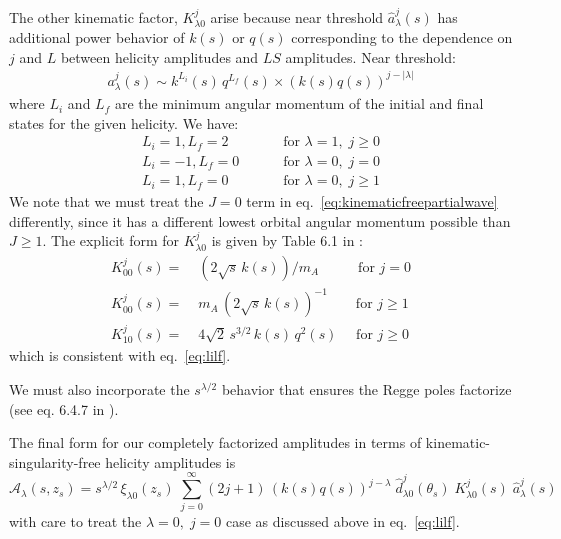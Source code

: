 \documentclass[10pt, aps,prd,amsmath,amssymb,superscriptaddress,onecolumn,
nofootinbib,showpacs,preprintnumbers]{revtex4-1}
\begin{document}
The other kinematic factor, \(K^j_{\lambda0}\) arise  because near threshold \(\hat{a}_\lambda^j(s)\) has additional power behavior of \(k(s)\) or \(q(s)\) corresponding to the dependence on \(j\) and \(L\) between helicity amplitudes and \(LS\) amplitudes. Near threshold:
  \begin{gather}
    a^j_\lambda(s) \sim k^{L_i}(s) \, q^{L_f}(s) \times (k(s)q(s))^{j- |\lambda|}
  \end{gather}
where \(L_i\) and \(L_f\) are the minimum angular momentum of the initial and final states for the given helicity. We have:
  \begin{align}
      L_i = 1 , L_f = 2& \qquad  \text{ for } \lambda = 1, \; j \geq 0 \nonumber \\
      L_i = -1, L_f = 0 &\qquad  \text{ for } \lambda = 0, \; j = 0  \label{eq:lilf} \\
      L_i = 1, L_f = 0 &\qquad  \text{ for } \lambda = 0, \;  j  \geq 1 \nonumber
  \end{align}
We note that we must treat the \(J=0\) term in eq.~\ref{eq:kinematicfreepartialwave} differently, since it has a different lowest orbital angular momentum possible than \(J\geq 1\). The explicit form for \(K^j_{\lambda0}\) is given by Table 6.1 in \cite{Collins}:
  \begin{align}
    \label{eq:k-factor}
    K^j_{00}(s) =& \;  ( 2\sqrt{s} \, k(s))/m_A \qquad \; \, \text{  for } j=0 \nonumber \\
    K^j_{00 }(s) =& \; m_A \, ( 2\sqrt{s} \, k(s))^{-1} \qquad \text{for } j\geq 1\\ \nonumber
    K^j_{10}(s) =& \; 4 \sqrt{2} \,  s^{3/2} \, k(s) \, q^2(s)  \quad \text{ for } j\geq 0
  \end{align}
which is consistent with eq.~\ref{eq:lilf}.

We must also incorporate the \(s^{\lambda/2}\) behavior that ensures the Regge poles factorize (see eq. 6.4.7 in \cite{Collins}).

The final form for our completely factorized amplitudes in terms of kinematic-singularity-free helicity amplitudes is
  \begin{equation}
    \mathcal{A}_\lambda(s,z_s) = s^{\lambda/2} \, \xi_{\lambda0}(z_s) \;  \sum_{j=0}^\infty (2j+1) \, (k(s)q(s))^{j-\lambda} \; \hat{d}^j_{\lambda0}(\theta_s) \; K^j_{\lambda0}(s) \; \hat{a}^j_\lambda(s)
  \end{equation}
with care to treat the \(\lambda =0, \;  j=0\) case as discussed above in eq.~\ref{eq:lilf}.
\end{document}
